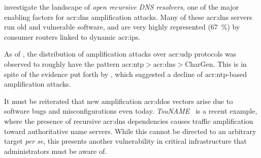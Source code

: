 \Textcite{DBLP:conf/imc/KuhrerHBRH15} investigate the landscape of \emph{open recursive DNS resolvers}, one of the major enabling factors for \gls{acr:dns} amplification attacks.
Many of these \gls{acr:dns} servers run old and vulnerable software, and are very highly represented (\qty{67}{\percent}) by consumer routers linked to dynamic \glspl{acr:ip}.

As of \citeyear{DBLP:conf/imc/JonkerKKRSD17}, the distribution of amplification attacks over \gls{acr:udp} protocols was observed to roughly have the pattern \gls{acr:ntp}$>$\gls{acr:dns}$>$CharGen.
This is in spite of the evidence put forth by \textcite{DBLP:conf/imc/CzyzKGPBK14}, which suggested a decline of \gls{acr:ntp}-based amplification attacks.


It must be reiterated that new amplification \gls{acr:ddos} vectors arise due to software bugs and misconfigurations even today.
\emph{TsuNAME}~\parencite{Moura21a} is a recent example, where the presence of recursive \gls{acr:dns} dependencies causes traffic amplification toward authoritative name servers.
While this cannot be directed to an arbitrary target \emph{per se}, this presents another vulnerability in critical infrastructure that administrators must be aware of.


